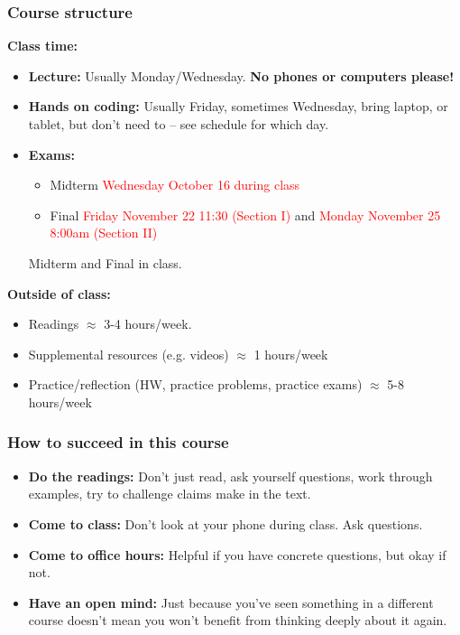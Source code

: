 \documentclass[serif,mathserif]{beamer}
\begin{document}
\begin{frame}
\frametitle{Course structure}

{\bf Class time:} 
\begin{itemize}
\item {\bf Lecture:} Usually Monday/Wednesday. {\bf No phones or computers please!}
\item {\bf Hands on coding:} Usually Friday, sometimes Wednesday, bring laptop, or tablet, but don't need to -- see schedule for which day. 
\item {\bf Exams:} 
\begin{itemize}
\item Midterm \textcolor{red}{Wednesday October 16 during class}
\item Final \textcolor{red}{Friday November 22 11:30 (Section I)} and \textcolor{red}{Monday November 25 8:00am (Section II)} 
\end{itemize}
Midterm and Final in class. 
\end{itemize}


\pause 
{\bf Outside of class:} 
\begin{itemize}
\item Readings $\approx$ 3-4 hours/week. 
\item Supplemental resources (e.g. videos) $\approx$ 1 hours/week
\item Practice/reflection (HW, practice problems, practice exams) $\approx$ 5-8 hours/week 
\end{itemize}


\end{frame}



\begin{frame} 
\frametitle{How to succeed in this course}
\begin{itemize}
\item {\bf Do the readings:} Don't just read, ask yourself questions, work through examples, try to challenge claims make in the text. 
\item {\bf Come to class:} Don't look at your phone during class. Ask questions. 
\item {\bf Come to office hours:} Helpful if you have concrete questions, but okay if not. 
\item {\bf Have an open mind:} Just because you've seen something in a different course doesn't mean you won't benefit from thinking deeply about it again. 
\end{itemize}

\end{frame}
\end{document}
